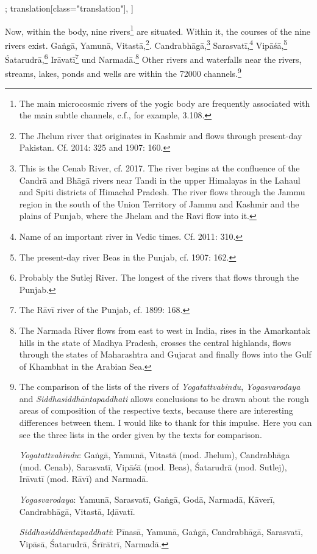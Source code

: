 \begin{alignment}[
  texts=edition[class="edition"];
  translation[class="translation"],
  ]
\begin{translation}
\begin{tlate}[p40_01]
  Now, within the body, nine rivers\footnote{The main microcosmic rivers of the yogic body are frequently associated with the main subtle channels, c.f., for example,  3.108.} are situated. Within it, the courses of the nine rivers exist. Gaṅgā, Yamunā, Vitastā,\footnote{The Jhelum river that originates in Kashmir and flows through present-day Pakistan. Cf. \citeauthor{slaje2014} 2014: 325 and \citeauthor{geldner1907} 1907: 160.}. Candrabhāgā,\footnote{This is the Cenab River, cf. \citeauthor{nandikesvara1917} 2017. The river begins at the confluence of the Candrā and Bhāgā rivers near Tandi in the upper Himalayas in the Lahaul and Spiti districts of Himachal Pradesh. The river flows through the Jammu region in the south of the Union Territory of Jammu and Kashmir and the plains of Punjab, where the Jhelam and the Ravi flow into it.} Sarasvatī,\footnote{Name of an important river in Vedic times. Cf. \citeauthor{wilke2011} 2011: 310.} Vipāśā,\footnote{The present-day river Beas in the Punjab, cf. \citeauthor{geldner1907} 1907: 162.} Śatarudrā,\footnote{Probably the Sutlej River. The longest of the rivers that flows through the Punjab.} Irāvatī\footnote{The Rāvī river of the Punjab, cf. \citeauthor{mw1899} 1899: 168.} und Narmadā.\footnote{The Narmada River flows from east to west in India, rises in the Amarkantak hills in the state of Madhya Pradesh, crosses the central highlands, flows through the states of Maharashtra and Gujarat and finally flows into the Gulf of Khambhat in the Arabian Sea.} Other rivers and waterfalls near the rivers, streams, lakes, ponds and wells are within the 72000 channels.\footnote{The comparison of the lists of the rivers of \emph{Yogatattvabindu}, \emph{Yogasvarodaya} and \emph{Siddhasiddhāntapaddhati} allows conclusions to be drawn about the rough areas of composition of the respective texts, because there are interesting differences between them. I would like to thank \citeauthor{mallinson2014b} for this impulse. Here you can see the three lists in the order given by the texts for comparison.

\emph{Yogatattvabindu}: Gaṅgā, Yamunā, Vitastā (mod. Jhelum), Candrabhāga (mod. Cenab), Sarasvatī, Vipāśā (mod. Beas), Śatarudrā (mod. Sutlej), Irāvatī (mod. Rāvī) and Narmadā.

\emph{Yogasvarodaya}: Yamunā, Sarasvatī, Gaṅgā, Godā, Narmadā, Kāverī, Candrabhāgā, Vitastā, Iḍāvatī.\

\emph{Siddhasiddhāntapaddhati}: Pīnasā, Yamunā, Gaṅgā, Candrabhāgā, Sarasvatī, Vipāsā, Śatarudrā, Śrīrātrī, Narmadā. 

}
\end{tlate}
\end{translation}
\end{alignment}
